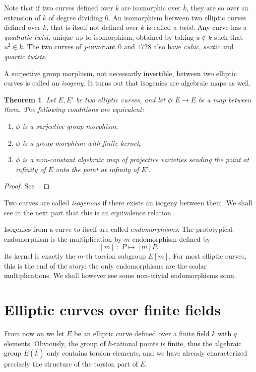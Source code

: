 \documentclass[10pt]{article}
\theoremstyle{plain}
\newtheorem{theorem}{Theorem}
\theoremstyle{definition}
\begin{document}
Note that if two curves defined over $k$ are isomorphic over
$\bar{k}$, they are so over an extension of $k$ of degree dividing
$6$. %
An isomorphism between two elliptic curves defined over $k$, that is
itself not defined over $k$ is called a \emph{twist}. %
Any curve has a \emph{quadratic twist}, unique up to isomorphism,
obtained by taking $u∉k$ such that $u^2∈k$. %
The two curves of $j$-invariant $0$ and $1728$ also have \emph{cubic},
\emph{sextic} and \emph{quartic twists}.

A surjective group morphism, not necessarily invertible, between two
elliptic curves is called an \emph{isogeny}. %
It turns out that isogenies are algebraic maps as well.

\begin{theorem}
  Let $E,E'$ be two elliptic curves, and let $\phi:E→E$ be a map between
  them. %
  The following conditions are equivalent:
  \begin{enumerate}
  \item $\phi$ is a surjective group morphism,
  \item $\phi$ is a group morphism with finite kernel,
  \item $\phi$ is a non-constant algebraic map of projective varieties
    sending the point at infinity of $E$ onto the point at infinity of
    $E'$.
  \end{enumerate}
\end{theorem}
\begin{proof}
  See~\cite[III, Th.~4.8]{silverman:elliptic}.
\end{proof}

Two curves are called \emph{isogenous} if there exists an isogeny
between them. %
We shall see in the next part that this is an equivalence relation.

Isogenies from a curve to itself are called \emph{endomorphisms}. %
The prototypical endomorphism is the multiplication-by-$m$
endomorphism defined by
\[[m]\;:\; P \mapsto [m]P.\] %
Its kernel is exactly the $m$-th torsion subgroup $E[m]$. %
For most elliptic curves, this is the end of the story: the only
endomorphisms are the scalar multiplications. %
We shall however see some non-trivial endomorphisms soon.


\section{Elliptic curves over finite fields}

From now on we let $E$ be an elliptic curve defined over a finite
field $k$ with $q$ elements. %
Obviously, the group of $k$-rational points is finite, thus the
algebraic group $E(\bar{k})$ only contains torsion elements, and we
have already characterized precisely the structure of the torsion part
of $E$.
\end{document}
